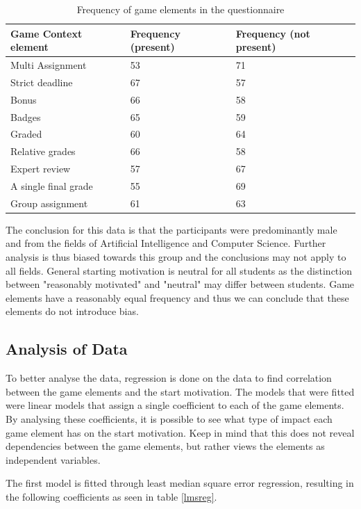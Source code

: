 \documentclass[11pt]{article}
\newcommand{\ra}[1]{\renewcommand{\arraystretch}{#1}}
\begin{document}
\begin{table}[h!t]\centering
\ra{1.3}
\footnotesize
\begin{tabular}{@{}lll@{}}
\toprule
Game Context element & Frequency (present) & Frequency (not present) \\ 
\midrule
Multi Assignment & 53 & 71 \\
Strict deadline & 67 & 57 \\
Bonus & 66 & 58 \\
Badges & 65 & 59 \\
Graded & 60 & 64 \\
Relative grades & 66 & 58 \\
Expert review & 57 & 67 \\
A single final grade & 55 & 69 \\
Group assignment & 61 & 63 \\
\bottomrule
\end{tabular}
\caption{Frequency of game elements in the questionnaire}
\label{tab:freqelem}
\end{table}

The conclusion for this data is that the participants were predominantly male and from the fields of Artificial Intelligence and Computer Science. Further analysis is thus biased towards this group and the conclusions may not apply to all fields. General starting motivation is neutral for all students as the distinction between "reasonably motivated" and "neutral" may differ between students.  Game elements have a reasonably equal frequency and thus we can conclude that these elements do not introduce bias.

\subsection{Analysis of Data}
To better analyse the data, regression is done on the data to find correlation between the game elements and the start motivation. The models that were fitted were linear models that assign a single coefficient to each of the game elements. By analysing these coefficients, it is possible to see what type of impact each game element has on the start motivation. Keep in mind that this does not reveal dependencies between the game elements, but rather views the elements as independent variables. 

The first model is fitted through least median square error regression, resulting in the following coefficients as seen in table \ref{lmsreg}.
\end{document}
